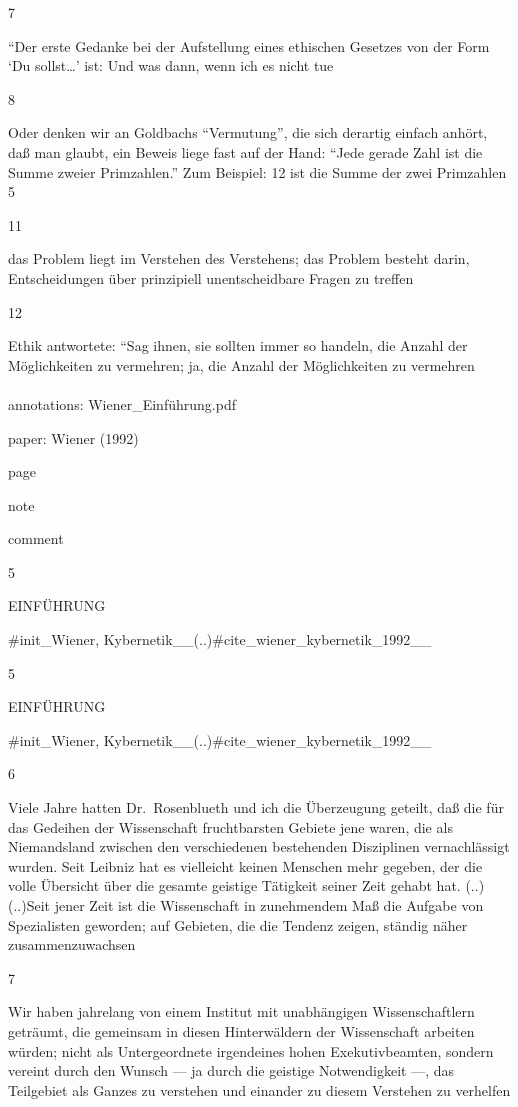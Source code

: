 \documentclass[
  letterpaper,
  DIV=11,
  numbers=noendperiod]{scrartcl}
\makeatletter
\let\oldparagraph\paragraph
\renewcommand{\paragraph}{
    \@ifstar
      \xxxParagraphStar
      \xxxParagraphNoStar
  }
\newcommand{\xxxParagraphStar}[1]{\oldparagraph*{#1}\mbox{}}
\newcommand{\xxxParagraphNoStar}[1]{\oldparagraph{#1}\mbox{}}
\makeatother
\begin{document}
7

``Der erste Gedanke bei der Aufstellung eines ethischen Gesetzes von der
Form `Du sollst\ldots{}' ist: Und was dann, wenn ich es nicht tue

8

Oder denken wir an Goldbachs ``Vermutung'', die sich derartig einfach
anhört, daß man glaubt, ein Beweis liege fast auf der Hand: ``Jede
gerade Zahl ist die Summe zweier Primzahlen.'' Zum Beispiel: 12 ist die
Summe der zwei Primzahlen 5

11

das Problem liegt im Verstehen des Verstehens; das Problem besteht
darin, Entscheidungen über prinzipiell unentscheidbare Fragen zu treffen

12

Ethik antwortete: ``Sag ihnen, sie sollten immer so handeln, die Anzahl
der Möglichkeiten zu vermehren; ja, die Anzahl der Möglichkeiten zu
vermehren

\paragraph{annotations:
Wiener\_Einführung.pdf}\label{annotations-wiener_einfuhrung.pdf}

paper: Wiener (1992)

page

note

comment

5

EINFÜHRUNG

\#init\_Wiener, Kybernetik\_\_(..)\#cite\_wiener\_kybernetik\_1992\_\_

5

EINFÜHRUNG

\#init\_Wiener, Kybernetik\_\_(..)\#cite\_wiener\_kybernetik\_1992\_\_

6

Viele Jahre hatten Dr.~Rosenblueth und ich die Überzeugung geteilt, daß
die für das Gedeihen der Wissenschaft fruchtbarsten Gebiete jene waren,
die als Niemandsland zwischen den verschiedenen bestehenden Disziplinen
vernachlässigt wurden. Seit Leibniz hat es vielleicht keinen Menschen
mehr gegeben, der die volle Übersicht über die gesamte geistige
Tätigkeit seiner Zeit gehabt hat. (..)(..)Seit jener Zeit ist die
Wissenschaft in zunehmendem Maß die Aufgabe von Spezialisten geworden;
auf Gebieten, die die Tendenz zeigen, ständig näher zusammenzuwachsen

7

Wir haben jahrelang von einem Institut mit unabhängigen Wissenschaftlern
geträumt, die gemeinsam in diesen Hinterwäldern der Wissenschaft
arbeiten würden; nicht als Untergeordnete irgendeines hohen
Exekutivbeamten, sondern vereint durch den Wunsch --- ja durch die
geistige Notwendigkeit ---, das Teilgebiet als Ganzes zu verstehen und
einander zu diesem Verstehen zu verhelfen
\end{document}
